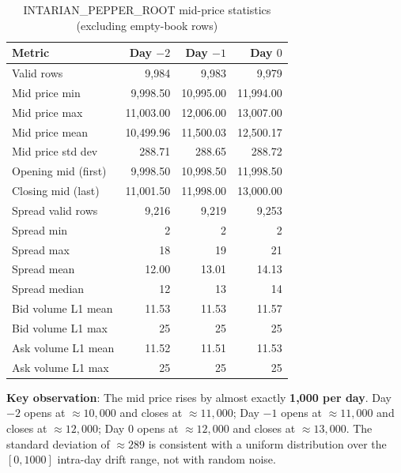 \documentclass[11pt,a4paper]{article}
\begin{document}
\begin{table}[H]
\centering
\caption{INTARIAN\_PEPPER\_ROOT mid-price statistics (excluding empty-book rows)}
\begin{tabular}{@{}lrrr@{}}
\toprule
\textbf{Metric} & \textbf{Day $-2$} & \textbf{Day $-1$} & \textbf{Day $0$} \\
\midrule
Valid rows              & 9,984       & 9,983       & 9,979 \\
Mid price min           & 9,998.50    & 10,995.00   & 11,994.00 \\
Mid price max           & 11,003.00   & 12,006.00   & 13,007.00 \\
Mid price mean          & 10,499.96   & 11,500.03   & 12,500.17 \\
Mid price std dev       & 288.71      & 288.65      & 288.72 \\
Opening mid (first)     & 9,998.50    & 10,998.50   & 11,998.50 \\
Closing mid (last)      & 11,001.50   & 11,998.00   & 13,000.00 \\
\midrule
Spread valid rows       & 9,216       & 9,219       & 9,253 \\
Spread min              & 2           & 2           & 2 \\
Spread max              & 18          & 19          & 21 \\
Spread mean             & 12.00       & 13.01       & 14.13 \\
Spread median           & 12          & 13          & 14 \\
\midrule
Bid volume L1 mean      & 11.53       & 11.53       & 11.57 \\
Bid volume L1 max       & 25          & 25          & 25 \\
Ask volume L1 mean      & 11.52       & 11.51       & 11.53 \\
Ask volume L1 max       & 25          & 25          & 25 \\
\bottomrule
\end{tabular}
\end{table}

\textbf{Key observation}: The mid price rises by almost exactly \textbf{1,000 per day}. Day $-2$ opens at $\approx 10{,}000$ and closes at $\approx 11{,}000$; Day $-1$ opens at $\approx 11{,}000$ and closes at $\approx 12{,}000$; Day $0$ opens at $\approx 12{,}000$ and closes at $\approx 13{,}000$. The standard deviation of $\approx 289$ is consistent with a uniform distribution over the $[0, 1000]$ intra-day drift range, not with random noise.
\end{document}
